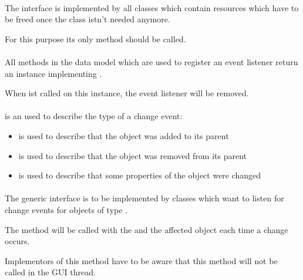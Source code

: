 \paragraph{}

The  interface is implemented by all classes which contain
resources which have to be freed once the class istn't needed anymore.

For this purpose its only method  should be called.

\paragraph{}

All methods in the data model which are used to register an event listener
return an instance implementing .

When  ist called on this instance, the event listener will be
removed.

\paragraph{}

 is an  used to describe the type of a change event:

\begin{itemize}
\item[\code{ADD}]
  is used to describe that the object was added to its parent
\item[\code{REMOVE}]
  is used to describe that the object was removed from its parent
\item[\code{CHANGE}]
  is used to describe that some properties of the object were changed
\end{itemize}

\paragraph{}

The generic interface  is to be implemented by classes
which want to listen
for change events for objects of type .

The method  will be called with the  and the
affected object each time a change occurs.

Implementors of this method have to be aware that this method will not
be called in the GUI thread.

